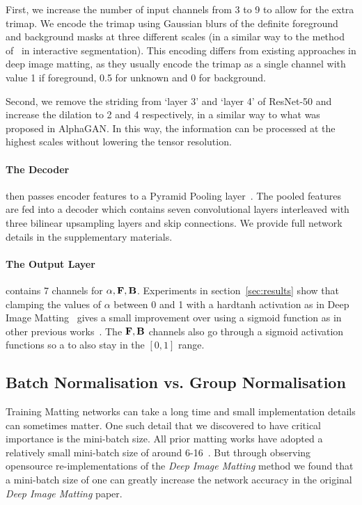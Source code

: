 \documentclass[runningheads]{llncs}
\begin{document}
First, we increase the number of input channels from 3 to 9 to allow for the
extra trimap.  We encode the trimap using Gaussian blurs of the definite
foreground and background masks at three different scales (in a similar way to
the method of~\cite{LeInteractiveSelection} in interactive segmentation). This
encoding differs from existing approaches in deep image matting, as they usually
encode the trimap as a single channel with value 1 if foreground, 0.5 for
unknown and 0 for background.

Second, we remove the striding from `layer 3' and `layer 4' of ResNet-50 and
increase the dilation to 2 and 4 respectively, in a similar way to what was
proposed in AlphaGAN. In this way, the information can be processed at the
highest scales without lowering the tensor resolution.

\paragraph{The Decoder} then passes encoder features to a Pyramid Pooling
layer~\cite{PSPNet}. The pooled features are fed into a decoder which contains
seven convolutional layers interleaved with three bilinear upsampling layers and
skip connections. We provide full network details in the supplementary materials.

\paragraph{The Output Layer} contains 7 channels for $\alpha, \mathbf{{{F}}}, \mathbf{{{B}}}$. 
Experiments in section~\ref{sec:results} show that clamping the values of $\alpha$
between 0 and 1 with a hardtanh activation as in Deep Image Matting~\cite{DeepImageMatting} gives a small improvement over using
a sigmoid function as in other previous works~\cite{VDRNMatting,GCAMatting,LearningBasedSamplingMatting,AlphaGAN,ContextMatting,DisentangledMatting}. The $\mathbf{{{F}}},\mathbf{{{B}}}$ channels also go through
a sigmoid activation functions so a to also stay in the $[0,1]$ range.


\subsection{Batch Normalisation vs. Group Normalisation}

Training Matting networks can take a long time and small implementation details
can sometimes matter. One such detail that we discovered to have critical
importance is the mini-batch size. All prior matting works have adopted a
relatively small mini-batch size of around 6-16~\cite{ContextMatting,GCAMatting}. But through observing opensource re-implementations\cite{pytorchDIM} of the \textit{Deep Image Matting} method we found that a mini-batch size of one can greatly increase the network
accuracy in the original \textit{Deep Image Matting} \cite{DeepImageMatting}
paper.
\end{document}
